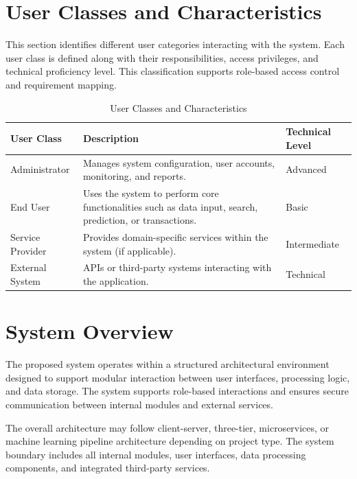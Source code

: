 \section{User Classes and Characteristics}

This section identifies different user categories interacting with the system. Each user class is defined along with their responsibilities, access privileges, and technical proficiency level. This classification supports role-based access control and requirement mapping.

\begin{table}[h]
\centering
\caption{User Classes and Characteristics}

\begin{tabularx}{\textwidth}{|p{3cm}|X|p{3cm}|}
\hline
\textbf{User Class} & \textbf{Description} & \textbf{Technical Level} \\
\hline
Administrator & Manages system configuration, user accounts, monitoring, and reports. & Advanced \\
\hline
End User & Uses the system to perform core functionalities such as data input, search, prediction, or transactions. & Basic \\
\hline
Service Provider & Provides domain-specific services within the system (if applicable). & Intermediate \\
\hline
External System & APIs or third-party systems interacting with the application. & Technical \\
\hline
\end{tabularx}

\end{table}


\section{System Overview}

The proposed system operates within a structured architectural environment designed to support modular interaction between user interfaces, processing logic, and data storage. The system supports role-based interactions and ensures secure communication between internal modules and external services.

The overall architecture may follow client-server, three-tier, microservices, or machine learning pipeline architecture depending on project type. The system boundary includes all internal modules, user interfaces, data processing components, and integrated third-party services.



